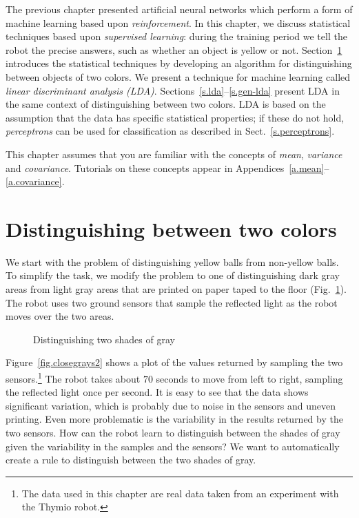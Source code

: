 The previous chapter presented artificial neural networks which perform a form of machine learning based upon \emph{reinforcement}. In this chapter, we discuss statistical techniques based upon \emph{supervised learning}: during the training period we tell the robot the precise answers, such as whether an object is yellow or not. Section~\ref{s.sorting-onesensor} introduces the statistical techniques by developing an algorithm for distinguishing between objects of two colors. We present a technique for machine learning called \emph{linear discriminant analysis (LDA)}. Sections~\ref{s.lda}--\ref{s.gen-lda} present LDA in the same context of distinguishing between two colors. LDA is based on the assumption that the data has specific statistical properties; if these do not hold, \emph{perceptrons} can be used for classification as described in Sect.~\ref{s.perceptrons}.

This chapter assumes that you are familiar with the concepts of \emph{mean}, \emph{variance} and \emph{covariance}. Tutorials on these concepts appear in Appendices~\ref{a.mean}--\ref{a.covariance}.

\section{Distinguishing between two colors}\label{s.sorting-onesensor}

We start with the problem of distinguishing yellow balls from non-yellow balls. To simplify the task, we modify the problem to one of distinguishing dark gray areas from light gray areas that are printed on paper taped to the floor (Fig.~\ref{fig.closegrays1}). The robot uses two ground sensors that sample the reflected light as the robot moves over the two areas.

\begin{figure}
\begin{center}
\end{center}
\caption{Distinguishing two shades of gray}\label{fig.closegrays1}
\end{figure}

Figure~\ref{fig.closegrays2} shows a plot of the values returned by sampling the two sensors.\footnote{The data used in this chapter are real data taken from an experiment with the Thymio robot.} The robot takes about $70$ seconds to move from left to right, sampling the reflected light once per second. It is easy to see that the data shows significant variation, which is probably due to noise in the sensors and uneven printing. Even more problematic is the variability in the results returned by the two sensors. How can the robot learn to distinguish between the shades of gray given the variability in the samples and the sensors? We want to automatically create a rule to distinguish between the two shades of gray.

